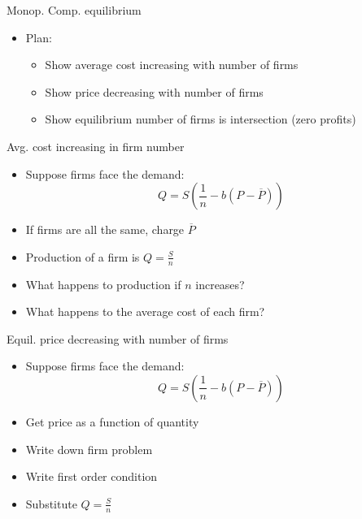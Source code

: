 \documentclass[ignorenonframetext,]{beamer}
\begin{document}
\begin{frame}{Monop. Comp. equilibrium} 

    \begin{itemize}
        \item Plan:
        \begin{itemize}
            \item Show average cost increasing with number of firms
            \item Show price decreasing with number of firms 
            \item Show equilibrium number of firms is intersection (zero profits)
        \end{itemize}
    \end{itemize}

\end{frame}

\begin{frame}{Avg. cost increasing in firm number} 
    \begin{itemize}
        \item Suppose firms face the demand:
            \begin{equation*}
                Q = S \left(\frac{1}{n} - b (P - \overline{P})\right)
            \end{equation*}
        \item If firms are all the same, charge $\overline{P}$
        \item Production of a firm is $Q = \frac{S}{n}$
        \item What happens to production if $n$ increases? 
        \item What happens to the average cost of each firm?
    \end{itemize}

\end{frame}

\begin{frame}{Equil. price decreasing with number of firms} 

    \begin{itemize}
        \item Suppose firms face the demand:
            \begin{equation*}
                Q = S \left(\frac{1}{n} - b (P - \overline{P})\right)
            \end{equation*}
        \item Get price as a function of quantity
        \item Write down firm problem
        \item Write first order condition 
        \item Substitute $Q = \frac{S}{n}$
    \end{itemize}

\end{frame}
\end{document}
